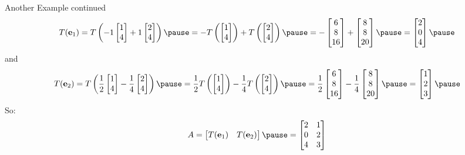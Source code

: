 \documentclass[xcoler=dvipsnames, aspectratio=169]{beamer}
\begin{document}
\begin{frame}{Another Example continued}
    \[
        T(\vec{e}_1) = T\left(-1\begin{bmatrix}1\\4\end{bmatrix}+1\begin{bmatrix}2\\4\end{bmatrix}\right)
            \pause = -T\left(\begin{bmatrix}1\\4\end{bmatrix}\right) + 
            T\left(\begin{bmatrix}2\\4\end{bmatrix}\right)\pause = 
            -\begin{bmatrix}6\\8\\16\end{bmatrix} + \begin{bmatrix}8\\8\\20\end{bmatrix}
            \pause = \begin{bmatrix}2\\0\\4\end{bmatrix}\pause
    \]
    and
    \[
        T(\vec{e}_2) = T\left(\frac{1}{2}\begin{bmatrix}1\\4\end{bmatrix}-\frac{1}{4}\begin{bmatrix}2\\4\end{bmatrix}\right)
            \pause = \frac{1}{2}T\left(\begin{bmatrix}1\\4\end{bmatrix}\right) -\frac{1}{4} 
            T\left(\begin{bmatrix}2\\4\end{bmatrix}\right)\pause = 
            \frac{1}{2}\begin{bmatrix}6\\8\\16\end{bmatrix} -\frac{1}{4} \begin{bmatrix}8\\8\\20\end{bmatrix}
            \pause = \begin{bmatrix}1\\2\\3\end{bmatrix}\pause
    \]
    So:
    \[
        A = \begin{bmatrix}T(\vec{e}_1) & T(\vec{e}_2)\end{bmatrix}\pause = \begin{bmatrix}
            2 & 1\\
            0 & 2\\
            4 & 3
        \end{bmatrix}
    \]
\end{frame}
\end{document}
